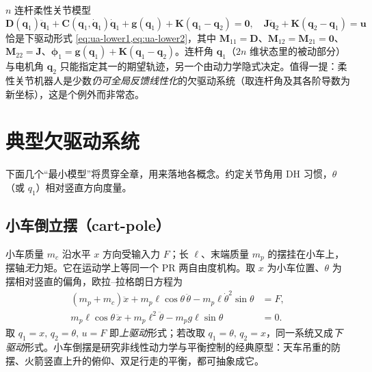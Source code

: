 \begin{example}[柔性关节机器人即欠驱动]\label{ex:ua-flexjoint}
$n$ 连杆柔性关节模型
\[
  \mathbf{D}(\mathbf{q}_1)\ddot{\mathbf{q}}_1+\mathbf{C}(\mathbf{q}_1,\dot{\mathbf{q}}_1)\dot{\mathbf{q}}_1+\mathbf{g}(\mathbf{q}_1)+\mathbf{K}(\mathbf{q}_1-\mathbf{q}_2)=\mathbf{0},\quad
  \mathbf{J}\ddot{\mathbf{q}}_2+\mathbf{K}(\mathbf{q}_2-\mathbf{q}_1)=\mathbf{u}
\]
恰是下驱动形式 \cref{eq:ua-lower1,eq:ua-lower2}，其中 $\mathbf{M}_{11}=\mathbf{D}$、$\mathbf{M}_{12}=\mathbf{M}_{21}=\mathbf{0}$、$\mathbf{M}_{22}=\mathbf{J}$、$\boldsymbol{\phi}_1=\mathbf{g}(\mathbf{q}_1)+\mathbf{K}(\mathbf{q}_1-\mathbf{q}_2)$。连杆角 $\mathbf{q}_1$（$2n$ 维状态里的被动部分）与电机角 $\mathbf{q}_2$ 只能指定其一的期望轨迹，另一个由动力学隐式决定。值得一提：柔性关节机器人是少数\emph{仍可全局反馈线性化}的欠驱动系统（取连杆角及其各阶导数为新坐标），这是个例外而非常态。
\end{example}

\section{典型欠驱动系统}\label{sec:ua-examples}

下面几个“最小模型”将贯穿全章，用来落地各概念。约定关节角用 DH 习惯，$\theta$（或 $q_1$）相对竖直方向度量。

\subsection{小车倒立摆（cart-pole）}\label{sec:ua-cartpole}
小车质量 $m_c$ 沿水平 $x$ 方向受输入力 $F$；长 $\ell$、末端质量 $m_p$ 的摆挂在小车上，摆轴\emph{无}力矩。它在运动学上等同一个 PR 两自由度机构。取 $x$ 为小车位置、$\theta$ 为摆相对竖直的偏角，欧拉--拉格朗日方程为
\begin{align}
  (m_p+m_c)\ddot{x}+m_p\ell\cos\theta\,\ddot{\theta}-m_p\ell\dot{\theta}^2\sin\theta&=F,\label{eq:ua-cart1}\\
  m_p\ell\cos\theta\,\ddot{x}+m_p\ell^2\ddot{\theta}-m_p g\ell\sin\theta&=0.\label{eq:ua-cart2}
\end{align}
取 $q_1=x,\,q_2=\theta,\,u=F$ 即\emph{上驱动}形式；若改取 $q_1=\theta,\,q_2=x$，同一系统又成\emph{下驱动}形式。小车倒摆是研究非线性动力学与平衡控制的经典原型：天车吊重的防摆、火箭竖直上升的俯仰、双足行走的平衡，都可抽象成它。

